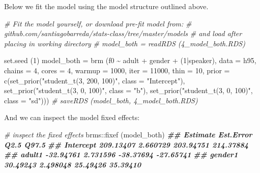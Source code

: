 \documentclass[
]{book}
\newenvironment{Shaded}{\begin{snugshade}}{\end{snugshade}}
\newcommand{\AttributeTok}[1]{\textcolor[rgb]{0.77,0.63,0.00}{#1}}
\newcommand{\CommentTok}[1]{\textcolor[rgb]{0.56,0.35,0.01}{\textit{#1}}}
\newcommand{\DecValTok}[1]{\textcolor[rgb]{0.00,0.00,0.81}{#1}}
\newcommand{\DocumentationTok}[1]{\textcolor[rgb]{0.56,0.35,0.01}{\textbf{\textit{#1}}}}
\newcommand{\FunctionTok}[1]{\textcolor[rgb]{0.00,0.00,0.00}{#1}}
\newcommand{\NormalTok}[1]{#1}
\newcommand{\OtherTok}[1]{\textcolor[rgb]{0.56,0.35,0.01}{#1}}
\newcommand{\SpecialCharTok}[1]{\textcolor[rgb]{0.00,0.00,0.00}{#1}}
\newcommand{\StringTok}[1]{\textcolor[rgb]{0.31,0.60,0.02}{#1}}
\begin{document}
Below we fit the model using the model structure outlined above.

\begin{Shaded}
\begin{Highlighting}[]
\CommentTok{\# Fit the model yourself, or download pre{-}fit model from: }
\CommentTok{\# github.com/santiagobarreda/stats{-}class/tree/master/models}
\CommentTok{\# and load after placing in working directory}
\CommentTok{\#  model\_both = readRDS (\textquotesingle{}4\_model\_both.RDS\textquotesingle{})}

\FunctionTok{set.seed}\NormalTok{ (}\DecValTok{1}\NormalTok{)}
\NormalTok{model\_both }\OtherTok{=}  
  \FunctionTok{brm}\NormalTok{ (f0 }\SpecialCharTok{\textasciitilde{}}\NormalTok{ adult }\SpecialCharTok{+}\NormalTok{ gender }\SpecialCharTok{+}\NormalTok{ (}\DecValTok{1}\SpecialCharTok{|}\NormalTok{speaker), }\AttributeTok{data =}\NormalTok{ h95, }\AttributeTok{chains =} \DecValTok{4}\NormalTok{, }\AttributeTok{cores =} \DecValTok{4}\NormalTok{, }
       \AttributeTok{warmup =} \DecValTok{1000}\NormalTok{, }\AttributeTok{iter =} \DecValTok{11000}\NormalTok{, }\AttributeTok{thin =} \DecValTok{10}\NormalTok{, }
       \AttributeTok{prior =} \FunctionTok{c}\NormalTok{(}\FunctionTok{set\_prior}\NormalTok{(}\StringTok{"student\_t(3, 200, 100)"}\NormalTok{, }\AttributeTok{class =} \StringTok{"Intercept"}\NormalTok{),}
                              \FunctionTok{set\_prior}\NormalTok{(}\StringTok{"student\_t(3, 0, 100)"}\NormalTok{, }\AttributeTok{class =} \StringTok{"b"}\NormalTok{),}
                              \FunctionTok{set\_prior}\NormalTok{(}\StringTok{"student\_t(3, 0, 100)"}\NormalTok{, }\AttributeTok{class =} \StringTok{"sd"}\NormalTok{))) }
\CommentTok{\#  saveRDS (model\_both, \textquotesingle{}4\_model\_both.RDS\textquotesingle{})}
\end{Highlighting}
\end{Shaded}

And we can inspect the model fixed effects:

\begin{Shaded}
\begin{Highlighting}[]
\CommentTok{\# inspect the fixed effects}
\NormalTok{brms}\SpecialCharTok{::}\FunctionTok{fixef}\NormalTok{ (model\_both)}
\DocumentationTok{\#\#            Estimate Est.Error      Q2.5     Q97.5}
\DocumentationTok{\#\# Intercept 209.13407  2.660729 203.94751 214.37884}
\DocumentationTok{\#\# adult1    {-}32.94761  2.731596 {-}38.37694 {-}27.65741}
\DocumentationTok{\#\# gender1    30.49243  2.498048  25.49426  35.39410}
\end{Highlighting}
\end{Shaded}
\end{document}
